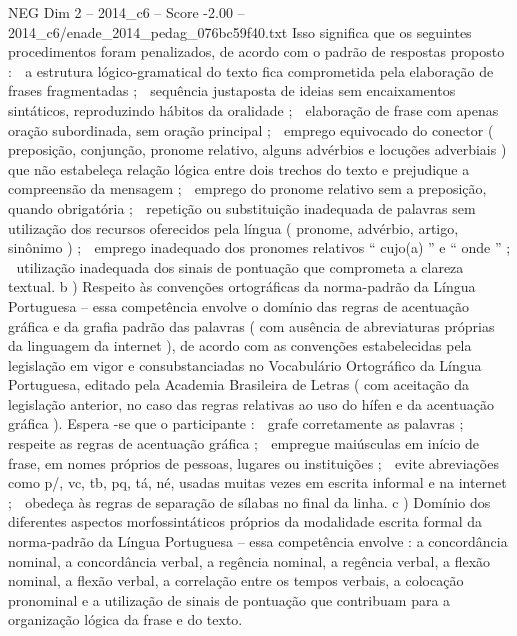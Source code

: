 \begin{textsample}{NEG Dim 2 – 2014\_c6 – Score -2.00 – 2014\_c6/enade\_2014\_pedag\_076bc59f40.txt}
Isso significa que os seguintes procedimentos foram penalizados, de acordo com o padrão de respostas proposto :  a estrutura lógico-gramatical do texto fica comprometida pela elaboração de frases fragmentadas ;  sequência justaposta de ideias sem encaixamentos sintáticos, reproduzindo hábitos da oralidade ;  elaboração de frase com apenas oração subordinada, sem oração principal ;  emprego equivocado do conector ( preposição, conjunção, pronome relativo, alguns advérbios e locuções adverbiais ) que não estabeleça relação lógica entre dois trechos do texto e prejudique a compreensão da mensagem ;  emprego do pronome relativo sem a preposição, quando obrigatória ;  repetição ou substituição inadequada de palavras sem utilização dos recursos oferecidos pela língua ( pronome, advérbio, artigo, sinônimo ) ;  emprego inadequado dos pronomes relativos “ cujo(a) ” e “ onde ” ;  utilização inadequada dos sinais de pontuação que comprometa a clareza textual. b ) Respeito às convenções ortográficas da norma-padrão da Língua Portuguesa – essa competência envolve o domínio das regras de acentuação gráfica e da grafia padrão das palavras ( com ausência de abreviaturas próprias da linguagem da internet ), de acordo com as convenções estabelecidas pela legislação em vigor e consubstanciadas no Vocabulário Ortográfico da Língua Portuguesa, editado pela Academia Brasileira de Letras ( com aceitação da legislação anterior, no caso das regras relativas ao uso do hífen e da acentuação gráfica ).
Espera -se que o participante :  grafe corretamente as palavras ;  respeite as regras de acentuação gráfica ;  empregue maiúsculas em início de frase, em nomes próprios de pessoas, lugares ou instituições ;  evite abreviações como p/, vc, tb, pq, tá, né, usadas muitas vezes em escrita informal e na internet ;  obedeça às regras de separação de sílabas no final da linha. c ) Domínio dos diferentes aspectos morfossintáticos próprios da modalidade escrita formal da norma-padrão da Língua Portuguesa – essa competência envolve : a concordância nominal, a concordância verbal, a regência nominal, a regência verbal, a flexão nominal, a flexão verbal, a correlação entre os tempos verbais, a colocação pronominal e a utilização de sinais de pontuação que contribuam para a organização lógica da frase e do texto.

\end{textsample}
